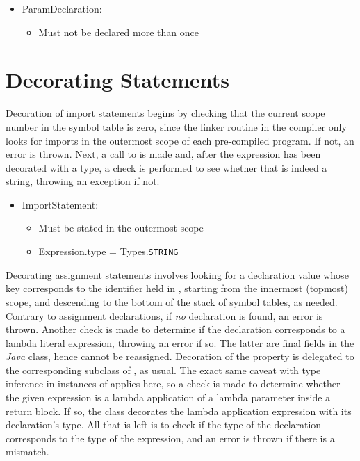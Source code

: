 \begin{itemize}
	\item ParamDeclaration:
		\begin{itemize}
			\item Must not be declared more than once
		\end{itemize}
\end{itemize}

\section{Decorating Statements}

Decoration of import statements begins by checking that the current scope number in the symbol table is zero, since the linker routine in the compiler only looks for imports in the outermost scope of each pre-compiled program. If not, an error is thrown. Next, a call to  is made and, after the expression has been decorated with a type, a check is performed to see whether that is indeed a string, throwing an exception if not.

\begin{itemize}
	\item ImportStatement:
		\begin{itemize}
			\item Must be stated in the outermost scope
			\item Expression.type = Types.\texttt{STRING}
		\end{itemize}
\end{itemize}

Decorating assignment statements involves looking for a declaration value whose key corresponds to the identifier held in , starting from the innermost (topmost) scope, and descending to the bottom of the stack of symbol tables, as needed. Contrary to assignment declarations, if \emph{no} declaration is found, an error is thrown. Another check is made to determine if the declaration corresponds to a lambda literal expression, throwing an error if so. The latter are final fields in the \emph{Java} class, hence cannot be reassigned. Decoration of the  property is delegated to the corresponding subclass of , as usual. The exact same caveat with type inference in instances of  applies here, so a check is made to determine whether the given expression is a lambda application of a lambda parameter inside a return block. If so, the  class decorates the lambda application expression with its declaration's type. All that is left is to check if the type of the declaration corresponds to the type of the expression, and an error is thrown if there is a mismatch.

